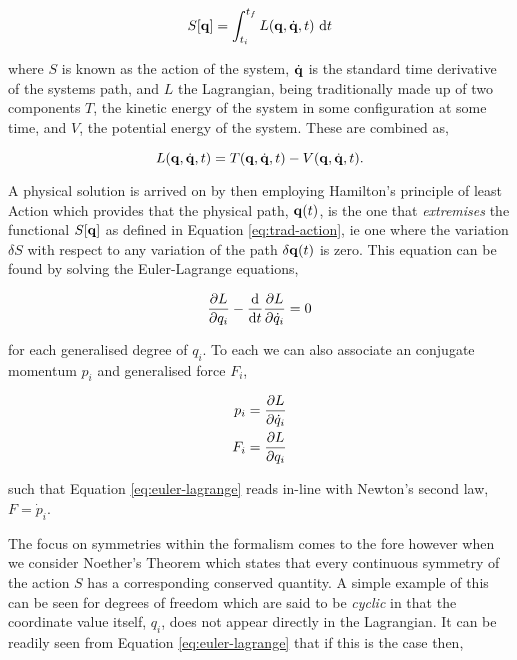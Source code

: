 \begin{equation}
  \label{eq:trad-action}
  S[\vb{q}] = \int_{t_i}^{t_f} L(\vb{q}, \dot{\vb{q}}, t) ~\mathrm{d} t
\end{equation}

where $S$ is known as the action of the system, $\dot{\vb{q}}$ is the standard time derivative of the systems path, and $L$ the Lagrangian, being traditionally made up of two components $T$, the kinetic energy of the system in some configuration at some time, and $V$, the potential energy of the system. These are combined as,

\begin{equation}
  \label{eq:trad-lag}
  L(\vb{q}, \dot{\vb{q}}, t) = T(\vb{q}, \dot{\vb{q}}, t) - V(\vb{q}, \dot{\vb{q}}, t).
\end{equation}

A physical solution is arrived on by then employing Hamilton's principle of least Action \cite{goldsteinClassicalMechanics2000} which provides that the physical path, $\vb q(t)$, is the one that \textit{extremises} the functional $S[\vb q]$ as defined in Equation \eqref{eq:trad-action}, ie one where the variation $\delta S$ with respect to any variation of the path $\delta \vb{q}(t)$ is zero. This equation can be found by solving the Euler-Lagrange equations,

\begin{equation}
	\label{eq:euler-lagrange}
	\frac{\partial L}{\partial q_i} - \frac{\dd}{\dd t}\frac{\partial L}{\partial \dot q_i} = 0
\end{equation}

for each generalised degree of $q_i$. To each we can also associate an conjugate momentum $p_i$ and generalised force $F_i$,

\begin{align}
  p_i = \frac{\partial L }{\partial \dot q_i} \\
  F_i = \frac{\partial L}{\partial q_i}
\end{align}

such that Equation \eqref{eq:euler-lagrange} reads in-line with Newton's second law, $F = \dot{p}_i$.

The focus on symmetries within the formalism comes to the fore however when we consider Noether's Theorem \cite{noetherInvariantVariationProblems1971} which states that every continuous symmetry of the action $S$ has a corresponding conserved quantity. A simple example of this can be seen for degrees of freedom which are said to be \emph{cyclic} in that the coordinate value itself, $q_i$, does not appear directly in the Lagrangian. It can be readily seen from Equation \eqref{eq:euler-lagrange} that if this is the case then,

